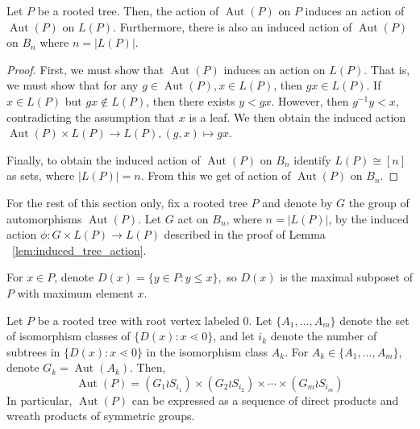 \documentclass[smallextended, envcountsame, numbook]{svjour3}
\numberwithin{equation}{section}
\newcommand\Aut{\operatorname{Aut}}
\begin{document}
\begin{lemma}
\label{lem:induced_tree_action}
Let $P$ be a rooted tree. Then, the action of $\Aut(P)$ on $P$ induces an action of $\Aut(P)$ on $L(P)$. Furthermore, there is also an induced action of $\Aut(P)$ on $B_n$ where $n = |L(P)|$. 
\end{lemma}
\begin{proof}
First, we must show that $\Aut(P)$ induces an action on $L(P)$. That is, we must show that for any $g \in \Aut(P),x \in L(P)$, then $gx \in L(P)$. If $x \in L(P)$ but $gx \notin L(P)$, then there exists $y < gx$. However, then $g^{-1}y < x$, contradicting the assumption that $x$ is a leaf. We then obtain the induced action $\Aut(P)\times L(P) \rightarrow L(P),(g,x)\mapsto gx$.

Finally, to obtain the induced action of $\Aut(P)$ on $B_n$ identify $L(P) \cong [n]$ as sets, where $|L(P)| = n$. From this we get of action of $\Aut(P)$ on $B_n$.
\end{proof}

For the rest of this section only, fix a rooted tree $P$ and denote by $G$ the group of automorphisms $\Aut(P)$. Let $G$ act on $B_n$, where $n = |L(P)|$, by the induced action $\phi\colon G \times L(P) \rightarrow L(P)$ described in the proof of Lemma ~\ref{lem:induced_tree_action}.

For $x \in P$, denote $D(x) = \{y \in P\colon y \leq x\},$ so $D(x)$ is the maximal subposet of $P$ with maximum element $x$.

\begin{proposition}
\label{prop:automorphism_trees}
Let $P$ be a rooted tree with root vertex labeled $0$. Let $\{A_1,\ldots,A_m\}$ denote the set of isomorphism classes of $\{D(x)\colon x\lessdot 0\}$, and let $i_k$ denote the number of subtrees in $\{D(x)\colon x\lessdot 0\}$ in the isomorphism class $A_k$. For $A_k \in \{A_1,\ldots,A_m\}$, denote $G_k = \Aut(A_k)$. Then, 
\begin{equation}
\label{eq:level_expansion}
\Aut(P) = (G_1 \wr S_{i_1}) \times (G_2 \wr S_{i_2}) \times \cdots \times (G_m\wr S_{i_m})
\end{equation}
In particular, $\Aut(P)$ can be expressed as a sequence of direct products and wreath products of symmetric groups.
\end{proposition}
\end{document}

